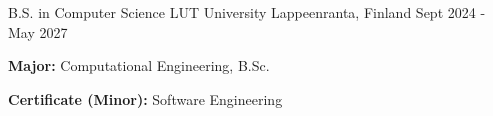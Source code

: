 

\begin{cventries}

  \cventryalt
    {B.S. in Computer Science} %
    {LUT University} %
    {Lappeenranta, Finland} %
    {Sept 2024 - May 2027} %
    {
      \begin{cvitems} %
        \item {\textbf{Major:} Computational Engineering, B.Sc.}
        \item {\textbf{Certificate (Minor):} Software Engineering}
      \end{cvitems}
    }
\end{cventries}
\vspace{-3.0mm}